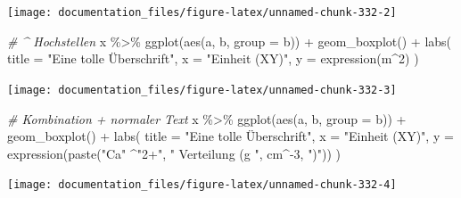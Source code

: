 \documentclass[
]{article}
\newenvironment{Shaded}{\begin{snugshade}}{\end{snugshade}}
\newcommand{\AttributeTok}[1]{\textcolor[rgb]{0.77,0.63,0.00}{#1}}
\newcommand{\CommentTok}[1]{\textcolor[rgb]{0.56,0.35,0.01}{\textit{#1}}}
\newcommand{\DecValTok}[1]{\textcolor[rgb]{0.00,0.00,0.81}{#1}}
\newcommand{\FunctionTok}[1]{\textcolor[rgb]{0.00,0.00,0.00}{#1}}
\newcommand{\NormalTok}[1]{#1}
\newcommand{\SpecialCharTok}[1]{\textcolor[rgb]{0.00,0.00,0.00}{#1}}
\newcommand{\StringTok}[1]{\textcolor[rgb]{0.31,0.60,0.02}{#1}}
\begin{document}
\begin{center}\texttt{[image: documentation\_files/figure-latex/unnamed-chunk-332-2]} \end{center}

\begin{Shaded}
\begin{Highlighting}[]

\CommentTok{\# \^{} Hochstellen}
\NormalTok{x }\SpecialCharTok{\%\textgreater{}\%}
  \FunctionTok{ggplot}\NormalTok{(}\FunctionTok{aes}\NormalTok{(a, b, }\AttributeTok{group =}\NormalTok{ b)) }\SpecialCharTok{+}
  \FunctionTok{geom\_boxplot}\NormalTok{() }\SpecialCharTok{+}
  \FunctionTok{labs}\NormalTok{(}
    \AttributeTok{title =} \StringTok{"Eine tolle Überschrift"}\NormalTok{,}
    \AttributeTok{x =} \StringTok{"Einheit (XY)"}\NormalTok{,}
    \AttributeTok{y =} \FunctionTok{expression}\NormalTok{(m}\SpecialCharTok{\^{}}\DecValTok{2}\NormalTok{)}
\NormalTok{  )}
\end{Highlighting}
\end{Shaded}

\begin{center}\texttt{[image: documentation\_files/figure-latex/unnamed-chunk-332-3]} \end{center}

\begin{Shaded}
\begin{Highlighting}[]

\CommentTok{\# Kombination + normaler Text}
\NormalTok{x }\SpecialCharTok{\%\textgreater{}\%}
  \FunctionTok{ggplot}\NormalTok{(}\FunctionTok{aes}\NormalTok{(a, b, }\AttributeTok{group =}\NormalTok{ b)) }\SpecialCharTok{+}
  \FunctionTok{geom\_boxplot}\NormalTok{() }\SpecialCharTok{+}
  \FunctionTok{labs}\NormalTok{(}
    \AttributeTok{title =} \StringTok{"Eine tolle Überschrift"}\NormalTok{,}
    \AttributeTok{x =} \StringTok{"Einheit (XY)"}\NormalTok{,}
    \AttributeTok{y =} \FunctionTok{expression}\NormalTok{(}\FunctionTok{paste}\NormalTok{(}\StringTok{"Ca"} \SpecialCharTok{\^{}}\StringTok{"2+"}\NormalTok{, }\StringTok{" Verteilung (g "}\NormalTok{, cm}\SpecialCharTok{\^{}{-}}\DecValTok{3}\NormalTok{, }\StringTok{")"}\NormalTok{))}
\NormalTok{  )}
\end{Highlighting}
\end{Shaded}

\begin{center}\texttt{[image: documentation\_files/figure-latex/unnamed-chunk-332-4]} \end{center}
\end{document}
